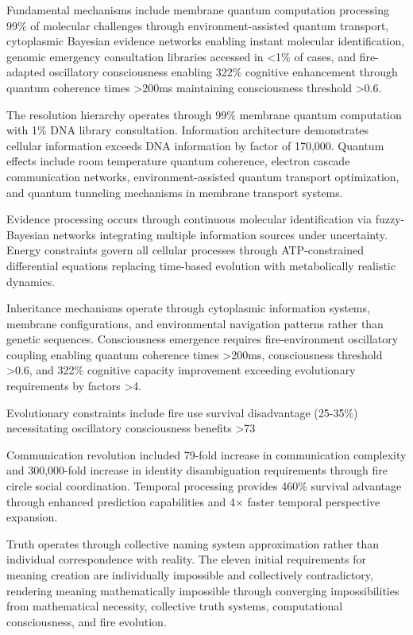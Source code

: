 \documentclass[12pt,a4paper]{article}
\begin{document}
Fundamental mechanisms include membrane quantum computation processing 99\% of molecular challenges through environment-assisted quantum transport, cytoplasmic Bayesian evidence networks enabling instant molecular identification, genomic emergency consultation libraries accessed in <1\% of cases, and fire-adapted oscillatory consciousness enabling 322\% cognitive enhancement through quantum coherence times >200ms maintaining consciousness threshold >0.6.

The resolution hierarchy operates through 99\% membrane quantum computation with 1\% DNA library consultation. Information architecture demonstrates cellular information exceeds DNA information by factor of 170,000. Quantum effects include room temperature quantum coherence, electron cascade communication networks, environment-assisted quantum transport optimization, and quantum tunneling mechanisms in membrane transport systems.

Evidence processing occurs through continuous molecular identification via fuzzy-Bayesian networks integrating multiple information sources under uncertainty. Energy constraints govern all cellular processes through ATP-constrained differential equations replacing time-based evolution with metabolically realistic dynamics.

Inheritance mechanisms operate through cytoplasmic information systems, membrane configurations, and environmental navigation patterns rather than genetic sequences. Consciousness emergence requires fire-environment oscillatory coupling enabling quantum coherence times >200ms, consciousness threshold >0.6, and 322\% cognitive capacity improvement exceeding evolutionary requirements by factors >4.

Evolutionary constraints include fire use survival disadvantage (25-35\%) necessitating oscillatory consciousness benefits >73%

Communication revolution included 79-fold increase in communication complexity and 300,000-fold increase in identity disambiguation requirements through fire circle social coordination. Temporal processing provides 460\% survival advantage through enhanced prediction capabilities and 4× faster temporal perspective expansion.

Truth operates through collective naming system approximation rather than individual correspondence with reality. The eleven initial requirements for meaning creation are individually impossible and collectively contradictory, rendering meaning mathematically impossible through converging impossibilities from mathematical necessity, collective truth systems, computational consciousness, and fire evolution.
\end{document}
